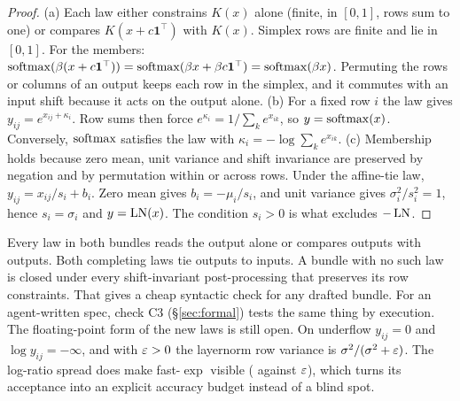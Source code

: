 \begin{proof}
(a) Each law either constrains $K(x)$ alone (finite, in $[0,1]$, rows sum to one) or
compares $K(x + c\mathbf 1^\top)$ with $K(x)$. Simplex rows are finite and lie in
$[0,1]$. For the members: $\operatorname{softmax}(\beta(x + c\mathbf 1^\top)) = \operatorname{softmax}(\beta x +
\beta c\mathbf 1^\top) = \operatorname{softmax}(\beta x)$. Permuting the rows or columns of an output
keeps each row in the simplex, and it commutes with an input shift because it acts on
the output alone.
(b) For a fixed row $i$ the law gives $y_{ij} = e^{x_{ij} + \kappa_i}$. Row sums then
force $e^{\kappa_i} = 1/\sum_k e^{x_{ik}}$, so $y = \operatorname{softmax}(x)$. Conversely, $\operatorname{softmax}$
satisfies the law with $\kappa_i = -\log\sum_k e^{x_{ik}}$.
(c) Membership holds because zero mean, unit variance and shift invariance are preserved by
negation and by permutation within or across rows. Under the affine-tie law,
$y_{ij} = x_{ij}/s_i + b_i$. Zero mean gives $b_i = -\mu_i/s_i$, and unit variance gives
$\sigma_i^2 / s_i^2 = 1$, hence $s_i = \sigma_i$ and $y = \operatorname{LN}(x)$. The condition $s_i > 0$ is
what excludes $-\operatorname{LN}$.
\end{proof}

\begin{remark}
Every law in both bundles reads the output alone or compares outputs with outputs. Both
completing laws tie outputs to inputs. A bundle with no such law is closed under every
shift-invariant post-processing that preserves its row constraints. That gives a cheap
syntactic check for any drafted bundle. For an agent-written spec, check C3
(\S\ref{sec:formal}) tests the same thing by execution. The floating-point form of the new
laws is still open. On underflow $y_{ij} = 0$ and $\log y_{ij} = -\infty$, and with
$\varepsilon > 0$ the layernorm row variance is $\sigma^2/(\sigma^2 + \varepsilon)$. The log-ratio
spread does make fast-$\exp$ visible (\spreadFastExp{} against \spreadExact{} $\varepsilon$),
which turns its acceptance into an explicit accuracy budget instead of a blind spot.
\end{remark}

